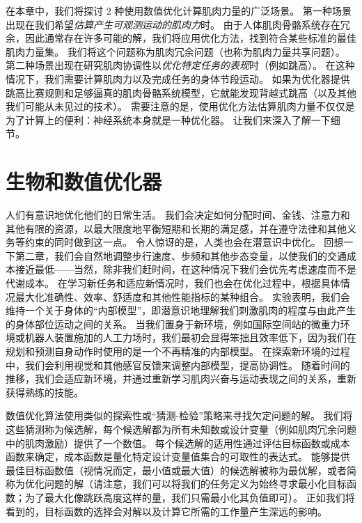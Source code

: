 在本章中，我们将探讨 2 种使用数值优化计算肌肉力量的广泛场景。
第一种场景出现在我们希望\textit{估算产生可观测运动的肌肉力}时。
由于人体肌肉骨骼系统存在冗余，因此通常存在许多可能的解，我们将应用优化方法，找到符合某些标准的最佳肌肉力量集。
我们将这个问题称为肌肉冗余问题（也称为肌肉力量共享问题）。
第二种场景出现在研究肌肉协调性以\textit{优化特定任务的表现}时（例如跳高）。
在这种情况下，我们需要计算肌肉力以及完成任务的身体节段运动。
如果为优化器提供跳高比赛规则和足够逼真的肌肉骨骼系统模型，它就能发现背越式跳高（以及其他我们可能从未见过的技术）。
需要注意的是，使用优化方法估算肌肉力量不仅仅是为了计算上的便利：神经系统本身就是一种优化器。
让我们来深入了解一下细节。


\section{生物和数值优化器}

人们有意识地优化他们的日常生活。
我们会决定如何分配时间、金钱、注意力和其他有限的资源，以最大限度地平衡短期和长期的满足感，并在遵守法律和其他义务等约束的同时做到这一点。
令人惊讶的是，人类也会在潜意识中优化。
回想一下第二章，我们会自然地调整步行速度、步频和其他步态变量，以使我们的交通成本接近最低——当然，除非我们赶时间，在这种情况下我们会优先考虑速度而不是代谢成本。
在学习新任务和适应新情况时，我们也会在优化过程中，根据具体情况最大化准确性、效率、舒适度和其他性能指标的某种组合。
实验表明，我们会维持一个关于身体的“内部模型”，即潜意识地理解我们刺激肌肉的程度与由此产生的身体部位运动之间的关系。
当我们置身于新环境，例如国际空间站的微重力环境或机器人装置施加的人工力场时，我们最初会显得笨拙且效率低下，因为我们在规划和预测自身动作时使用的是一个不再精准的内部模型。
在探索新环境的过程中，我们会利用视觉和其他感官反馈来调整内部模型，提高协调性。
随着时间的推移，我们会适应新环境，并通过重新学习肌肉兴奋与运动表现之间的关系，重新获得熟练的技能。


数值优化算法使用类似的探索性或“猜测-检验”策略来寻找欠定问题的解。
我们将这些猜测称为候选解，每个候选解都为所有未知数或设计变量（例如肌肉冗余问题中的肌肉激励）提供了一个数值。
每个候选解的适用性通过评估目标函数或成本函数来确定，成本函数是量化特定设计变量值集合的可取性的表达式。
能够提供最佳目标函数值（视情况而定，最小值或最大值）的候选解被称为最优解，或者简称为优化问题的解（请注意，我们可以将我们的任务定义为始终寻求最小化目标函数；为了最大化像跳跃高度这样的量，我们只需最小化其负值即可）。
正如我们将看到的，目标函数的选择会对解以及计算它所需的工作量产生深远的影响。


